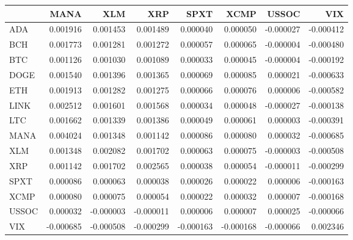 \begin{tabular}{lrrrrrrr}
\toprule
 & MANA & XLM & XRP & SPXT & XCMP & USSOC & VIX \\
\midrule
ADA & 0.001916 & 0.001453 & 0.001489 & 0.000040 & 0.000050 & -0.000027 & -0.000412 \\
BCH & 0.001773 & 0.001281 & 0.001272 & 0.000057 & 0.000065 & -0.000004 & -0.000480 \\
BTC & 0.001126 & 0.001030 & 0.001089 & 0.000033 & 0.000045 & -0.000004 & -0.000192 \\
DOGE & 0.001540 & 0.001396 & 0.001365 & 0.000069 & 0.000085 & 0.000021 & -0.000633 \\
ETH & 0.001913 & 0.001282 & 0.001275 & 0.000066 & 0.000076 & 0.000006 & -0.000582 \\
LINK & 0.002512 & 0.001601 & 0.001568 & 0.000034 & 0.000048 & -0.000027 & -0.000138 \\
LTC & 0.001662 & 0.001339 & 0.001386 & 0.000049 & 0.000061 & 0.000003 & -0.000391 \\
MANA & 0.004024 & 0.001348 & 0.001142 & 0.000086 & 0.000080 & 0.000032 & -0.000685 \\
XLM & 0.001348 & 0.002082 & 0.001702 & 0.000063 & 0.000075 & -0.000003 & -0.000508 \\
XRP & 0.001142 & 0.001702 & 0.002565 & 0.000038 & 0.000054 & -0.000011 & -0.000299 \\
SPXT & 0.000086 & 0.000063 & 0.000038 & 0.000026 & 0.000022 & 0.000006 & -0.000163 \\
XCMP & 0.000080 & 0.000075 & 0.000054 & 0.000022 & 0.000032 & 0.000007 & -0.000168 \\
USSOC & 0.000032 & -0.000003 & -0.000011 & 0.000006 & 0.000007 & 0.000025 & -0.000066 \\
VIX & -0.000685 & -0.000508 & -0.000299 & -0.000163 & -0.000168 & -0.000066 & 0.002346 \\
\bottomrule
\end{tabular}
